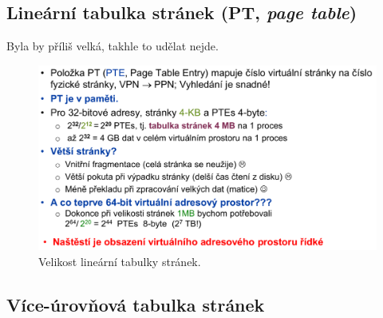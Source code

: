 \subsection{Lineární tabulka stránek (PT, \textit{page table})}

\begin{compactitem}
    \item Byla by příliš velká, takhle to udělat nejde.

    \begin{figure}[H]
        \centering
        \includegraphics[width=1\linewidth]{linearni_tabulka_stranek.pdf}
        \caption{Velikost lineární tabulky stránek.}
    \end{figure}
\end{compactitem}

\subsection{Více-úrovňová tabulka stránek}

